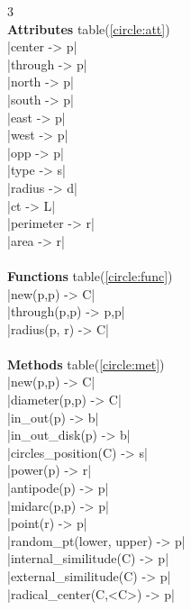 \documentclass[DIV         = 14,
               fontsize    = 10,
               index       = totoc,
               twoside,
               cadre,
               headings    = small
               ]{tkz-doc}
\begin{document}
\begin{multicols}{3}
             \\
\textbf{Attributes} table(\ref{circle:att}) \\
|center                    -> p|  \\
|through                   -> p|  \\
|north                     -> p|  \\
|south                     -> p|  \\
|east                      -> p|  \\
|west                      -> p|  \\
|opp                       -> p|  \\
|type                      -> s|   \\
|radius                    -> d|   \\
|ct                        -> L|   \\ 
|perimeter                 -> r|   \\ 
|area                      -> r|   \\ 
\\
\textbf{Functions} table(\ref{circle:func})  \\
|new(p,p)                  -> C|   \\
|through(p,p)            -> p,p|   \\
|radius(p, r)              -> C|   \\
\\
\textbf{Methods} table(\ref{circle:met})  \\
|new(p,p)                  -> C|   \\
|diameter(p,p)             -> C|   \\ 
|in_out(p)                 -> b|   \\ 
|in_out_disk(p)            -> b|   \\ 
|circles_position(C)       -> s|   \\ 
|power(p)                  -> r|   \\ 
|antipode(p)               -> p|   \\ 
|midarc(p,p)               -> p|   \\ 
|point(r)                  -> p|   \\ 
|random_pt(lower, upper)   -> p|   \\ 
|internal_similitude(C)    -> p|   \\ 
|external_similitude(C)    -> p|   \\ 
|radical_center(C,<C>)     -> p|   \\

\end{multicols}
\end{document}
